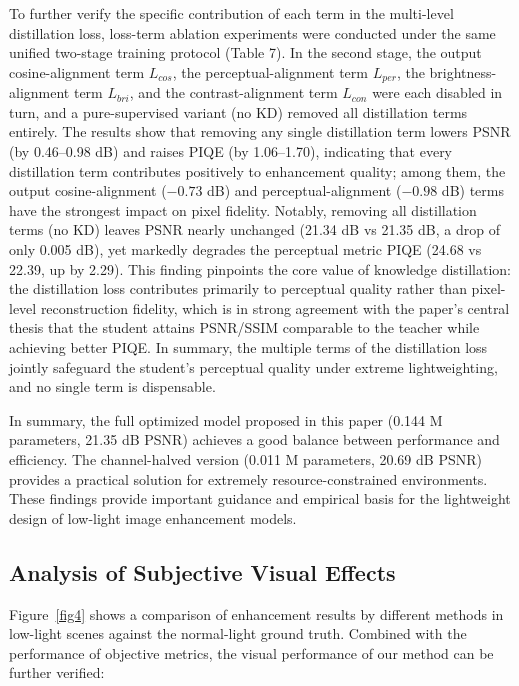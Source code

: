 \documentclass[sensors,article,submit,moreauthors]{Definitions/mdpi}
\begin{document}
To further verify the specific contribution of each term in the multi-level distillation loss, loss-term ablation experiments were conducted under the same unified two-stage training protocol (Table 7). In the second stage, the output cosine-alignment term $L_{cos}$, the perceptual-alignment term $L_{per}$, the brightness-alignment term $L_{bri}$, and the contrast-alignment term $L_{con}$ were each disabled in turn, and a pure-supervised variant (no KD) removed all distillation terms entirely. The results show that removing any single distillation term lowers PSNR (by 0.46--0.98 dB) and raises PIQE (by 1.06--1.70), indicating that every distillation term contributes positively to enhancement quality; among them, the output cosine-alignment ($-0.73$ dB) and perceptual-alignment ($-0.98$ dB) terms have the strongest impact on pixel fidelity. Notably, removing all distillation terms (no KD) leaves PSNR nearly unchanged (21.34 dB vs 21.35 dB, a drop of only 0.005 dB), yet markedly degrades the perceptual metric PIQE (24.68 vs 22.39, up by 2.29). This finding pinpoints the core value of knowledge distillation: the distillation loss contributes primarily to perceptual quality rather than pixel-level reconstruction fidelity, which is in strong agreement with the paper's central thesis that the student attains PSNR/SSIM comparable to the teacher while achieving better PIQE. In summary, the multiple terms of the distillation loss jointly safeguard the student's perceptual quality under extreme lightweighting, and no single term is dispensable.

In summary, the full optimized model proposed in this paper (0.144 M parameters, 21.35 dB PSNR) achieves a good balance between performance and efficiency. The channel-halved version (0.011 M parameters, 20.69 dB PSNR) provides a practical solution for extremely resource-constrained environments. These findings provide important guidance and empirical basis for the lightweight design of low-light image enhancement models.

\subsection{Analysis of Subjective Visual Effects}

Figure~\ref{fig4} shows a comparison of enhancement results by different methods in low-light scenes against the normal-light ground truth. Combined with the performance of objective metrics, the visual performance of our method can be further verified:
\end{document}
